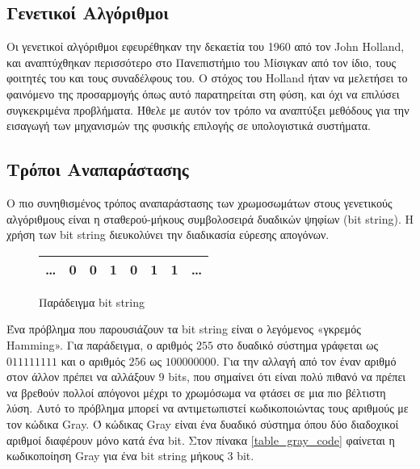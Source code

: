 \subsection{Γενετικοί Αλγόριθμοι}

Οι γενετικοί αλγόριθμοι εφευρέθηκαν την δεκαετία του 1960 από τον John Holland, και αναπτύχθηκαν περισσότερο στο Πανεπιστήμιο του Μίσιγκαν από τον ίδιο, τους φοιτητές του και τους συναδέλφους του. Ο στόχος του Holland ήταν να μελετήσει το φαινόμενο της προσαρμογής όπως αυτό παρατηρείται στη φύση, και όχι να επιλύσει συγκεκριμένα προβλήματα. Ήθελε με αυτόν τον τρόπο να αναπτύξει μεθόδους για την εισαγωγή των μηχανισμών της φυσικής επιλογής σε υπολογιστικά συστήματα. \cite{Melanie1999}

\subsection{Τρόποι Αναπαράστασης}

Ο πιο συνηθισμένος τρόπος αναπαράστασης των χρωμοσωμάτων στους γενετικούς αλγόριθμους είναι η σταθερού-μήκους συμβολοσειρά δυαδικών ψηφίων (bit string). Η χρήση των bit string διευκολύνει την διαδικασία εύρεσης απογόνων.

\begin{figure}[!t]
    \renewcommand{\arraystretch}{1.3}
    \label{fig_bit_string}
    \centering
    \begin{tabular}{c|c|c|c|c|c|c|c}
        \hline
        \ldots & 0 & 0 & 1 & 0 & 1 & 1 & \ldots\\
        \hline
    \end{tabular}
    \caption{Παράδειγμα bit string}
\end{figure}

Ένα πρόβλημα που παρουσιάζουν τα bit string είναι ο λεγόμενος «γκρεμός Hamming». Για παράδειγμα, ο αριθμός $255$ στο δυαδικό σύστημα γράφεται ως $011111111$ και ο αριθμός $256$ ως $100000000$. Για την αλλαγή από τον έναν αριθμό στον άλλον πρέπει να αλλάξουν $9$ bits, που σημαίνει ότι είναι πολύ πιθανό να πρέπει να βρεθούν πολλοί απόγονοι μέχρι το χρωμόσωμα να φτάσει σε μια πιο βέλτιστη λύση. Αυτό το πρόβλημα μπορεί να αντιμετωπιστεί κωδικοποιώντας τους αριθμούς με τον κώδικα Gray. Ό κώδικας Gray είναι ένα δυαδικό σύστημα όπου δύο διαδοχικοί αριθμοί διαφέρουν μόνο κατά ένα bit. \cite{Lehre} Στον πίνακα \ref{table_gray_code} φαίνεται η κωδικοποίηση Gray για ένα bit string μήκους 3 bit.

